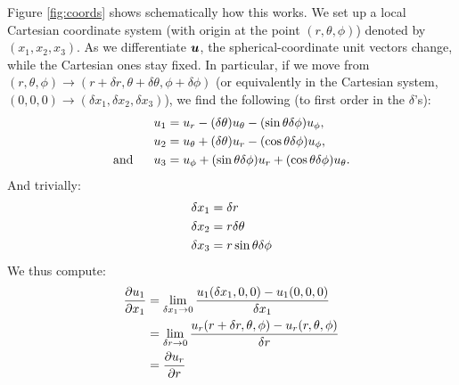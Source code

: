 \documentclass[12pt]{article}
\begin{document}
Figure \ref{fig:coords} shows schematically how this works. We set up a local Cartesian coordinate system (with origin at the point $(r,\theta,\phi)$) denoted by $(x_1,x_2,x_3)$. As we differentiate $\bm{u}$, the spherical-coordinate unit vectors change, while the Cartesian ones stay fixed. In particular, if we move from $(r,\theta,\phi)\rightarrow (r+\delta r, \theta + \delta\theta, \phi + \delta\phi)$ (or equivalently in the Cartesian system, $(0, 0, 0)\rightarrow (\delta x_1, \delta x_2, \delta x_3)$), we find the following (to first order in the $\delta$'s):
\begin{subequations}
\begin{align}
	u_1 &= u_r - (\delta\theta)u_\theta - (\sin\theta\delta\phi)u_\phi,\\ 
	u_2 &= u_\theta + (\delta\theta)u_r - (\cos\theta\delta\phi)u_\phi, \\ 
	\text{and}\ \ \ \ \  u_3 &= u_\phi + (\sin\theta\delta\phi)u_r + (\cos\theta\delta\phi)u_\theta.
\end{align}
\end{subequations}
And trivially:
\begin{subequations}
	\begin{align}
		\delta x_1 &= \delta r \\ 
		\delta x_2 &= r\delta\theta\\
		\delta x_3 &= r\sin\theta\delta\phi
	\end{align}
\end{subequations}
We thus compute:
\begin{align}
	\frac{\partial u_1}{\partial x_1} &= \lim_{\delta x_1\rightarrow0}\frac{u_1(\delta x_1, 0, 0) - u_1(0,0,0)}{\delta x_1}\nonumber\\
	&=  \lim_{\delta r\rightarrow0}\frac{u_r(r+\delta r, \theta, \phi) - u_r(r,\theta,\phi)}{\delta r}\nonumber\\
	&= \frac{\partial u_r}{\partial r}
\end{align}
\end{document}
